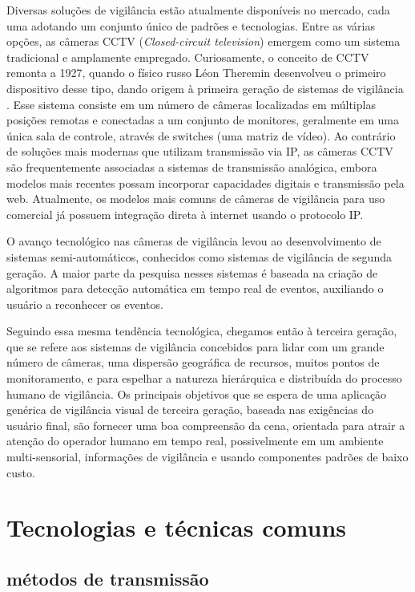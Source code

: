 \documentclass[12pt, %
openright, 
oneside, %
a4paper,    %
brazil]{facom-ufu-abntex2}
\begin{document}
Diversas soluções de vigilância estão atualmente disponíveis no mercado, cada
uma adotando um conjunto único de padrões e tecnologias. Entre as várias
opções, as câmeras CCTV (\textit{\foreignlanguage{english}{Closed-circuit
		television}}) emergem como um sistema tradicional e amplamente empregado.
Curiosamente, o conceito de CCTV remonta a 1927, quando o físico russo Léon
Theremin desenvolveu o primeiro dispositivo desse tipo, dando origem à primeira
geração de sistemas de vigilância \cite{glinsky2000theremin}. Esse sistema
consiste em um número de câmeras localizadas em múltiplas posições remotas e
conectadas a um conjunto de monitores, geralmente em uma única sala de
controle, através de switches (uma matriz de vídeo). Ao contrário de soluções
mais modernas que utilizam transmissão via IP, as câmeras CCTV são
frequentemente associadas a sistemas de transmissão analógica, embora modelos
mais recentes possam incorporar capacidades digitais e transmissão pela web.
Atualmente, os modelos mais comuns de câmeras de vigilância para uso comercial
já possuem integração direta à internet usando o protocolo IP.

O avanço tecnológico nas câmeras de vigilância levou ao desenvolvimento de
sistemas semi-automáticos, conhecidos como sistemas de vigilância de segunda
geração. A maior parte da pesquisa nesses sistemas é baseada na criação de
algoritmos para detecção automática em tempo real de eventos, auxiliando o
usuário a reconhecer os eventos.

Seguindo essa mesma tendência tecnológica, chegamos então à terceira geração,
que se refere aos sistemas de vigilância concebidos para lidar com um grande
número de câmeras, uma dispersão geográfica de recursos, muitos pontos de
monitoramento, e para espelhar a natureza hierárquica e distribuída do processo
humano de vigilância. Os principais objetivos que se espera de uma aplicação
genérica de vigilância visual de terceira geração, baseada nas exigências do
usuário final, são fornecer uma boa compreensão da cena, orientada para atrair
a atenção do operador humano em tempo real, possivelmente em um ambiente
multi-sensorial, informações de vigilância e usando componentes padrões de
baixo custo.

\section{Tecnologias e técnicas comuns}

\subsection{métodos de transmissão}
\end{document}
